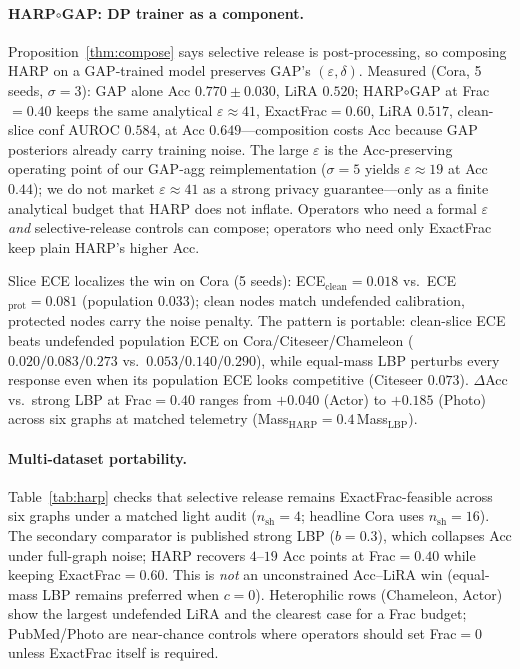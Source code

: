 \documentclass[conference]{IEEEtran}
\begin{document}
\paragraph{HARP$\circ$GAP: DP trainer as a component.}
Proposition~\ref{thm:compose} says selective release is post-processing, so composing HARP on a GAP-trained model preserves GAP's $(\varepsilon,\delta)$.
Measured (Cora, 5 seeds, $\sigma{=}3$): GAP alone Acc $0.770{\pm}0.030$, LiRA $0.520$; HARP$\circ$GAP at Frac${=}0.40$ keeps the same analytical $\varepsilon{\approx}41$, ExactFrac${=}0.60$, LiRA $0.517$, clean-slice conf AUROC $0.584$, at Acc $0.649$---composition costs Acc because GAP posteriors already carry training noise.
The large $\varepsilon$ is the Acc-preserving operating point of our GAP-agg reimplementation ($\sigma{=}5$ yields $\varepsilon{\approx}19$ at Acc $0.44$); we do not market $\varepsilon{\approx}41$ as a strong privacy guarantee---only as a finite analytical budget that HARP does not inflate.
Operators who need a formal $\varepsilon$ \emph{and} selective-release controls can compose; operators who need only ExactFrac keep plain HARP's higher Acc.

Slice ECE localizes the win on Cora (5 seeds): ECE$_{\mathrm{clean}}{=}0.018$ vs.\ ECE$_{\mathrm{prot}}{=}0.081$ (population $0.033$); clean nodes match undefended calibration, protected nodes carry the noise penalty.
The pattern is portable: clean-slice ECE beats undefended population ECE on Cora/Citeseer/Chameleon ($0.020/0.083/0.273$ vs.\ $0.053/0.140/0.290$), while equal-mass LBP perturbs every response even when its population ECE looks competitive (Citeseer $0.073$).
$\Delta$Acc vs.\ strong LBP at Frac$=0.40$ ranges from $+0.040$ (Actor) to $+0.185$ (Photo) across six graphs at matched telemetry (Mass$_{\mathrm{HARP}}{=}0.4\,$Mass$_{\mathrm{LBP}}$).

\paragraph{Multi-dataset portability.}
Table~\ref{tab:harp} checks that selective release remains ExactFrac-feasible across six graphs under a matched light audit ($n_{\mathrm{sh}}{=}4$; headline Cora uses $n_{\mathrm{sh}}{=}16$).
The secondary comparator is published strong LBP ($b{=}0.3$), which collapses Acc under full-graph noise; HARP recovers $4$--$19$ Acc points at Frac${=}0.40$ while keeping ExactFrac${=}0.60$.
This is \emph{not} an unconstrained Acc--LiRA win (equal-mass LBP remains preferred when $c{=}0$).
Heterophilic rows (Chameleon, Actor) show the largest undefended LiRA and the clearest case for a Frac budget; PubMed/Photo are near-chance controls where operators should set Frac${=}0$ unless ExactFrac itself is required.
\end{document}

